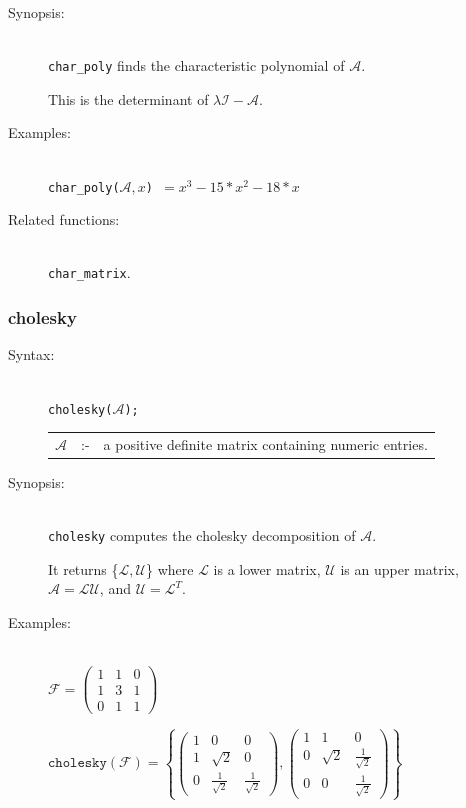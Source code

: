 {\begin{description}
\item[Synopsis:]\mbox{}\\
\texttt{char\_poly} finds the characteristic polynomial of
                $\mathcal{A}$.

This is the determinant of $\lambda \mathcal{I} - \mathcal{A}$.

\item[Examples:]\mbox{}\\
{\tt char\_poly($\mathcal{A},x$) $= x^3-15*x^2-18*x$}

\item[Related functions:]\mbox{}\\
 \texttt{char\_matrix}.
\end{description}


\subsubsection{cholesky}
\label{linalg:cholesky}
\hypertarget{operator:CHOLESKY}{}

\begin{description}
\item[Syntax:]\mbox{}\\
{\tt cholesky($\mathcal{A}$);}\\[2mm]
\begin{tabular}{l l l}
$\mathcal{A}$ &:-& a positive definite matrix containing numeric entries.
\end{tabular}

\item[Synopsis:]\mbox{}\\
\texttt{cholesky} computes the cholesky decomposition of $\mathcal{A}$.

It returns \{$\mathcal{L},\mathcal{U}$\} where $\mathcal{L}$
is a lower matrix, $\mathcal{U}$ is an upper matrix, \\ $\mathcal{A} =
\mathcal{LU}$, and $\mathcal{U} = \mathcal{L}^T$.

\item[Examples:]\mbox{}\\
  \(\mathcal{F} = \begin{pmatrix} 1 & 1 & 0 \\ 1 & 3 & 1 \\ 0 & 1 & 1 \end{pmatrix}\)

  \(\texttt{cholesky}(\mathcal{F})  =
  \left\{ \begin{pmatrix} 1 & 0 & 0 \\ 1 & \sqrt{2} & 0 \\
    0 & \frac{1}{\sqrt{2}} & \frac{1}{\sqrt{2}} \end{pmatrix},
  \begin{pmatrix} 1 & 1 & 0 \\ 0 & \sqrt{2} & \frac{1}{\sqrt{2}} \\ 0
    & 0 & \frac{1}{\sqrt{2}} \end{pmatrix}
  \right\}\)


\end{description}}
